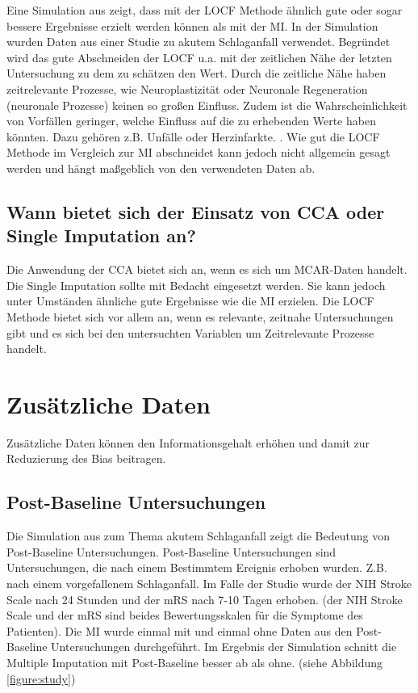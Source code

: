 Eine Simulation aus \textcite[]{Young-Saver2018} zeigt, dass mit der LOCF Methode ähnlich gute oder sogar bessere 
Ergebnisse erzielt werden können als mit der MI. In der Simulation wurden Daten aus einer Studie zu akutem Schlaganfall 
verwendet. Begründet wird das gute Abschneiden der LOCF u.a. mit der zeitlichen Nähe der letzten Untersuchung zu dem zu 
schätzen den Wert. Durch die zeitliche Nähe haben zeitrelevante Prozesse, wie Neuroplastizität oder Neuronale Regeneration 
(neuronale Prozesse) keinen so großen Einfluss. Zudem ist die Wahrscheinlichkeit von Vorfällen geringer, welche Einfluss 
auf die zu erhebenden Werte haben könnten. Dazu gehören z.B. Unfälle oder Herzinfarkte. \autocite[3667]{Young-Saver2018}. 
Wie gut die LOCF Methode im Vergleich zur MI abschneidet kann jedoch nicht allgemein gesagt werden und hängt maßgeblich 
von den verwendeten Daten ab. 


\subsection{Wann bietet sich der Einsatz von CCA oder Single Imputation an?}

Die Anwendung der CCA bietet sich an, wenn es sich um MCAR-Daten handelt. 
Die Single Imputation sollte mit Bedacht eingesetzt werden. Sie kann jedoch unter Umständen ähnliche gute Ergebnisse 
wie die MI erzielen. Die LOCF Methode bietet sich vor allem an, wenn es relevante, zeitnahe Untersuchungen gibt und es 
sich bei den untersuchten Variablen um Zeitrelevante Prozesse handelt. 


\section{Zusätzliche Daten}
\label{section:additional_data}

Zusätzliche Daten können den Informationsgehalt erhöhen und damit zur Reduzierung des Bias beitragen.

\subsection{Post-Baseline Untersuchungen}

Die Simulation aus \textcite[]{Young-Saver2018} zum Thema akutem Schlaganfall zeigt die Bedeutung von Post-Baseline Untersuchungen. Post-Baseline Untersuchungen sind
 Untersuchungen, die nach einem Bestimmtem Ereignis erhoben wurden. Z.B. nach einem vorgefallenem Schlaganfall. Im Falle der Studie wurde der NIH Stroke Scale 
 nach 24 Stunden und der mRS nach 7-10 Tagen erhoben. (der NIH Stroke Scale und der mRS sind beides Bewertungsskalen
  für die Symptome des Patienten). Die MI wurde einmal mit und einmal ohne Daten aus den Post-Baseline Untersuchungen 
  durchgeführt. Im Ergebnis der Simulation schnitt die Multiple Imputation mit Post-Baseline besser ab als ohne. (siehe Abbildung \ref{figure:study})

